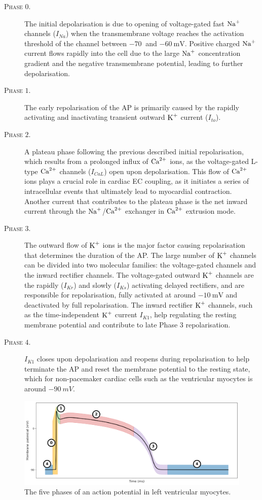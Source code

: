 \begin{description}
	\item[\textsc{Phase $0$.}] The initial depolarisation is due to opening of voltage-gated fast $\textrm{Na}^{+}$ channels ($I_{Na}$) when the transmembrane voltage reaches the activation threshold of the channel between $\SI{-70}{}$ and $\SI{-60}{\milli\volt}$. Positive charged $\textrm{Na}^{+}$ current flows rapidly into the cell due to the large $\textrm{Na}^{+}$ concentration gradient and the negative transmembrane potential, leading to further depolarisation.
	\item[\textsc{Phase $1$.}] The early repolarisation of the AP is primarily caused by the rapidly activating and inactivating transient outward $\textrm{K}^{+}$ current ($I_{to}$).
	\item[\textsc{Phase $2$.}] A plateau phase following the previous described initial repolarisation, which results from a prolonged influx of $\textrm{Ca}^{2+}$ ions, as the voltage-gated L-type $\textrm{Ca}^{2+}$ channels ($I_{CaL}$) open upon depolarisation. This flow of $\textrm{Ca}^{2+}$ ions plays a crucial role in cardiac EC coupling, as it initiates a series of intracellular events that ultimately lead to myocardial contraction. Another current that contributes to the plateau phase is the net inward current through the $\textrm{Na}^{+}$/$\textrm{Ca}^{2+}$ exchanger in $\textrm{Ca}^{2+}$ extrusion mode.
	\item[\textsc{Phase $3$.}] The outward flow of $\textrm{K}^{+}$ ions is the major factor causing repolarisation that determines the duration of the AP. The large number of $\textrm{K}^{+}$ channels can be divided into two molecular families: the voltage-gated channels and the inward rectifier channels. The voltage-gated outward $\textrm{K}^{+}$ channels are the rapidly ($I_{Kr}$) and slowly ($I_{Ks}$) activating delayed rectifiers, and are responsible for repolarisation, fully activated at around $\SI{-10}{\milli\volt}$ and deactivated by full repolarisation. The inward rectifier $\textrm{K}^{+}$ channels, such as the time-independent $\textrm{K}^{+}$ current $I_{K1}$, help regulating the resting membrane potential and contribute to late Phase $3$ repolarisation.
	\item[\textsc{Phase $4$.}] $I_{K1}$ closes upon depolarisation and reopens during repolarisation to help terminate the AP and reset the membrane potential to the resting state, which for non-pacemaker cardiac cells such as the ventricular myocytes is around $\SI{-90}{mV}$.
\end{description}

\begin{figure}[!ht]
    \myfloatalign
    \includegraphics[width=\textwidth]{figures/chapter01/AP_phases.pdf}
    \caption{The five phases of an action potential in left ventricular myocytes.}
    \label{fig:my_label}
\end{figure}

